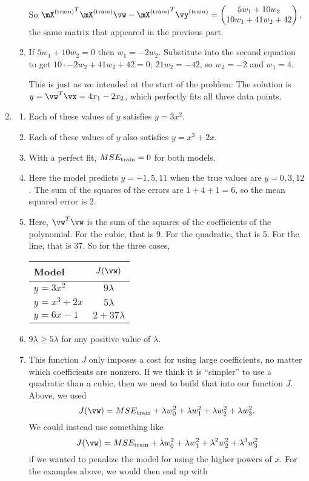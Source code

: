\documentclass{article}
\newcommand{\utrain}{^{\textnormal{(train)}}}
\newcommand{\strain}{_{\textnormal{train}}}
\begin{document}
\begin{enumerate}
\begin{enumerate}
\begin{align*}
        \end{align*}
        So ${\mX\utrain}^T\mX\utrain\vw - {\mX\utrain}^T\vy\utrain =
        \begin{pmatrix}
            5w_1 + 10w_2 \\ 
            10w_1 + 41w_2 + 42
            \end{pmatrix}$, the same matrix that appeared in the previous part.
    \item If $5w_1 + 10w_2 = 0$ then $w_1 = -2w_2$. Substitute into the second equation to get $10\cdot-2w_2 + 41w_2 + 42 = 0$; $21w_2 = -42$, so $w_2 = -2$ and $w_1 = 4$.
    
    This is just as we intended at the start of the problem: The solution is $y = \vw^T\vx = 4x_1 - 2x_2$, which perfectly fits all three data points.
\end{enumerate}
    

\item \label{ML_ex_hyperparameter_solution}
\begin{enumerate}
    \item Each of these values of $y$ satisfies $y = 3x^2$.
    \item Each of these values of $y$ also satisfies $y = x^3 + 2x$.
    \item With a perfect fit, $MSE\strain = 0$ for both models.
    \item Here the model predicts $y = -1, 5, 11$ when the true values are $y = 0, 3, 12$. The sum of the squares of the errors are $1 + 4 + 1 = 6$, so the mean squared error is $2$.
    \item Here, $\vw^T\vw$ is the sum of the squares of the coefficients of the polynomial. For the cubic, that is 9. For the quadratic, that is 5. For the line, that is 37. So for the three cases,
    \begin{tabular}{l|c}
    Model & $J(\vw)$ \\
    \hline
    $y = 3x^2$     & $9\lambda$ \\
    $y = x^3 + 2x$ & $5\lambda$ \\
    $y = 6x - 1$   & $2 + 37\lambda$
    \end{tabular}
    \item $9\lambda \geq 5\lambda$ for any positive value of $\lambda$.
    \item This function $J$ only imposes a cost for using large coefficients, no matter which coefficients are nonzero. If we think it is ``simpler'' to use a quadratic than a cubic, then we need to build that into our function $J$. Above, we used 
    \begin{equation*} J(\vw) = MSE\strain + \lambda w_0^2+\lambda w_1^2+\lambda w_2^2+\lambda w_3^2. \end{equation*}
    We could instead use something like
    \begin{equation*} J(\vw) = MSE\strain + \lambda w_0^2+\lambda w_1^2+ \lambda^2 w_2^2+ \lambda^3 w_3^2 \end{equation*}
    if we wanted to penalize the model for using the higher powers of $x$. For the examples above, we would then end up with


\end{enumerate}
\end{enumerate}
\end{document}
